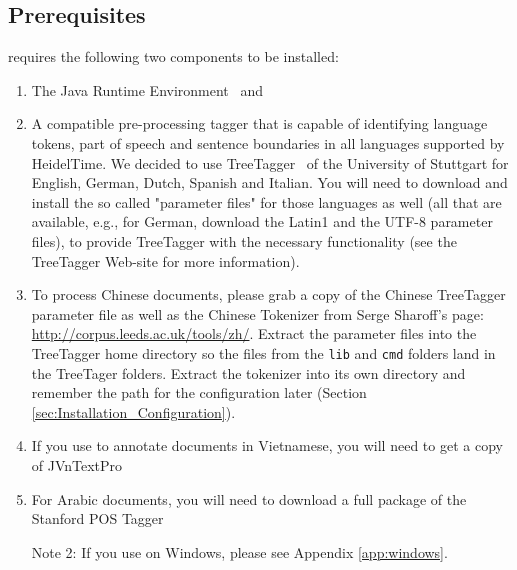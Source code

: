 \subsection{Prerequisites}\label{sec:Installation_Prerequisites}
\product{} requires the following two components to be installed:
\begin{enumerate}
\item The Java Runtime Environment~\cite{Java} and
\item A compatible pre-processing tagger that is capable of identifying language tokens, part of speech and sentence boundaries in all languages supported by HeidelTime. We decided to use TreeTagger~\cite{TreeTagger} of the University of Stuttgart for English, German, Dutch, Spanish and Italian. You will need to download and install the so called "parameter files" for those languages as well (all that are available, e.g., for German, download the Latin1 and the UTF-8 parameter files), to provide TreeTagger with the necessary functionality (see the TreeTagger Web-site for more information).
\item To process Chinese documents, please grab a copy of the Chinese TreeTagger parameter file as well as the Chinese Tokenizer from Serge Sharoff's page: \url{http://corpus.leeds.ac.uk/tools/zh/}. Extract the parameter files into the TreeTagger home directory so the files from the \texttt{lib} and \texttt{cmd} folders land in the TreeTager folders. Extract the tokenizer into its own directory and remember the path for the configuration later (Section \ref{sec:Installation_Configuration}).
\item If you use \product{} to annotate documents in Vietnamese, you will need to get a copy of JVnTextPro~\cite{JVnTextPro}
\item For Arabic documents, you will need to download a full package of the Stanford POS Tagger~\cite{StanfordPOSTagger}

Note 2: If you use \product{} on Windows, please see Appendix \ref{app:windows}.
\end{enumerate}

